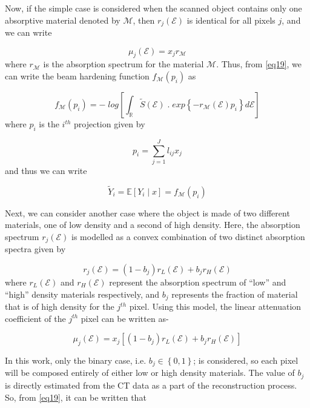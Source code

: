 Now, if the simple case is considered when the scanned object contains only one absorptive material denoted by $\mathcal{M}$, then $r_j(\mathcal{E})$ is identical for all pixels $j$, and we can write

\begin{equation}
\label{eq24}
\mu_{j}(\mathcal{E}) = x_j r_\mathcal{M}
\end{equation} where $r_\mathcal{M}$ is the absorption spectrum for the material $\mathcal{M}$. Thus, from \ref{eq19}, we can write the beam hardening function $f_\mathcal{M}(p_i)$ as

\begin{equation}
\label{eq25}
f_\mathcal{M}(p_i) = - \; log \left[ \int_{\mathbb{R}} \widetilde{S}(\mathcal{E}) \; . \; exp \left\lbrace - r_\mathcal{M}(\mathcal{E}) p_i  \right\rbrace d\mathcal{E}  \right]
\end{equation} where $p_i$ is the $i^{th}$ projection given by


\begin{equation}
\label{eq26}
p_i = \sum\limits_{j=1}^J l_{ij} x_j
\end{equation} and thus we can write

\begin{equation}
\label{eq27}
\widetilde{Y}_{i} = \mathbb{E} \left[ Y_i\mid x \right] = f_\mathcal{M}(p_i) 
\end{equation} 
 
 
Next, we can consider another case where the object is made of two different materials, one of low density and a second of high density. Here, the absorption spectrum $r_j(\mathcal{E})$ is modelled as a convex combination of two distinct absorption spectra given by


\begin{equation}
\label{eq28}
r_j(\mathcal{E})= (1-b_j)r_L(\mathcal{E}) + b_j r_H(\mathcal{E})
\end{equation} where $r_L(\mathcal{E})$ and $r_H(\mathcal{E})$ represent  the absorption spectrum of ``low'' and ``high'' density materials respectively, and $b_j$ represents the fraction of material that is of high density for the $j^{th}$ pixel. Using this model, the linear attenuation coefficient of the $j^{th}$ pixel can be written as- 

\begin{equation}
\label{eq29}
\mu_j(\mathcal{E})= x_j \left[(1-b_j)r_L(\mathcal{E}) + b_j r_H(\mathcal{E})\right]
\end{equation}

In this work, only the binary case, i.e. $b_j \in \left\lbrace 0 , 1 \right\rbrace $; is considered, so each pixel will be composed entirely of either low or high density materials. The value of $b_j$ is directly estimated from the CT data as a part of the reconstruction process. So, from \ref{eq19}, it can be written that 

